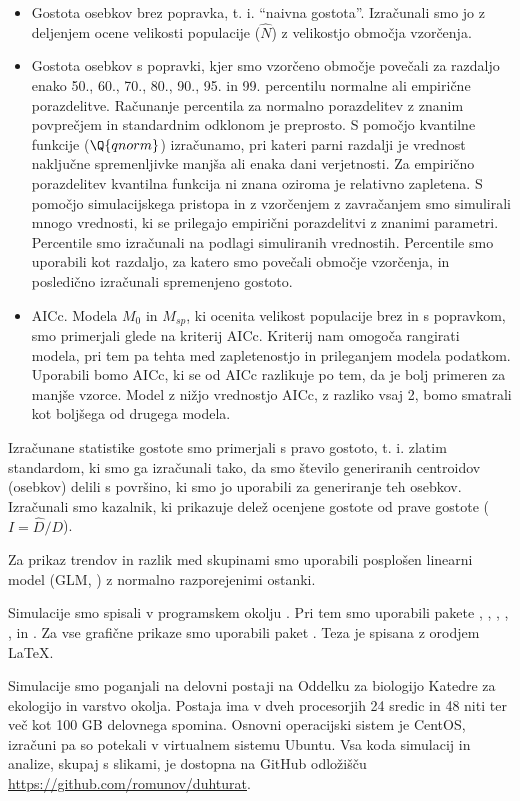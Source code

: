 \begin{itemize}
  \item Gostota osebkov brez popravka, t. i. ``naivna gostota''. Izračunali smo jo z deljenjem ocene velikosti populacije ($\hat{N}$) z velikostjo območja vzorčenja.
  \item Gostota osebkov s popravki, kjer smo vzorčeno območje povečali za razdaljo enako 50., 60., 70., 80., 90., 95. in 99. percentilu normalne ali empirične porazdelitve.
Računanje percentila za normalno porazdelitev z znanim povprečjem in standardnim odklonom je preprosto. S pomočjo kvantilne funkcije ($\Q{qnorm}$) izračunamo, pri kateri parni razdalji je vrednost naključne spremenljivke manjša ali enaka dani verjetnosti.
Za empirično porazdelitev kvantilna funkcija ni znana oziroma je relativno zapletena. S pomočjo simulacijskega pristopa in z vzorčenjem z zavračanjem smo simulirali mnogo vrednosti, ki se prilegajo empirični porazdelitvi z znanimi parametri. Percentile smo izračunali na podlagi simuliranih vrednostih. Percentile smo uporabili kot razdaljo, za katero smo povečali območje vzorčenja, in posledično izračunali spremenjeno gostoto.
  \item AICc. Modela $M_0$ in $M_{sp}$, ki ocenita velikost populacije brez in s popravkom, smo primerjali glede na kriterij AICc. Kriterij nam omogoča rangirati modela, pri tem pa tehta med zapletenostjo in prileganjem modela podatkom. Uporabili bomo AICc, ki se od AICc razlikuje po tem, da je bolj primeren za manjše vzorce. Model z nižjo vrednostjo AICc, z razliko vsaj 2, bomo smatrali kot boljšega od drugega modela.
\end{itemize}

Izračunane statistike gostote smo primerjali s pravo gostoto, t. i. zlatim standardom, ki smo ga izračunali tako, da smo število generiranih centroidov (osebkov) delili s površino, ki smo jo uporabili za generiranje teh osebkov. Izračunali smo kazalnik, ki prikazuje delež ocenjene gostote od prave gostote ($I = \hat{D}/D$).

Za prikaz trendov in razlik med skupinami smo uporabili posplošen linearni model (GLM, \citet{faraway_extending_2006}) z normalno razporejenimi ostanki.

Simulacije smo spisali v programskem okolju  \citep{r_core_team_r_2018}. Pri tem smo uporabili pakete  \citep{bivand_applied_2008},  \citep{hijmans_ability_2006},  \citep{bivand_rundel_2017},  \citep{maechler_et_al_2018},  \citep{rowlingson_diggle_2017},  \citep{microsoft_2017} in  \citep{doparallel_2017}. Za vse grafične prikaze smo uporabili paket  \citep{wickham_ggplot2_2009}. Teza je spisana z orodjem \LaTeX.

Simulacije smo poganjali na delovni postaji na Oddelku za biologijo Katedre za ekologijo in varstvo okolja. Postaja ima v dveh procesorjih 24 sredic in 48 niti ter več kot 100 GB delovnega spomina. Osnovni operacijski sistem je CentOS, izračuni pa so potekali v virtualnem sistemu Ubuntu. Vsa koda simulacij in analize, skupaj s slikami, je dostopna na GitHub odložišču \url{https://github.com/romunov/duhturat}.
